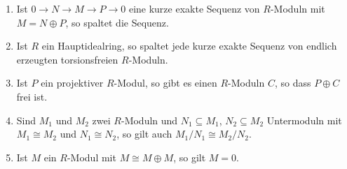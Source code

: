 \begin{question}[subtitle = Multiple Choice]
\begin{enumerate}
    \item
      Ist $0 \to N \to M \to P \to 0$ eine kurze exakte Sequenz von $R$-Moduln mit $M = N \oplus P$, so spaltet die Sequenz.
    \item
      Ist $R$ ein Hauptidealring, so spaltet jede kurze exakte Sequenz von endlich erzeugten torsionsfreien $R$-Moduln.
    \item
      Ist $P$ ein projektiver $R$-Modul, so gibt es einen $R$-Moduln $C$, so dass $P \oplus C$ frei ist.
    \item
      Sind $M_1$ und $M_2$ zwei $R$-Moduln und $N_1 \subseteq M_1$, $N_2 \subseteq M_2$ Untermoduln mit $M_1 \cong M_2$ und $N_1 \cong N_2$, so gilt auch $M_1/N_1 \cong M_2/N_2$.
    \item
      Ist $M$ ein $R$-Modul mit $M \cong M \oplus M$, so gilt $M = 0$.
  \end{enumerate}
\end{question}


